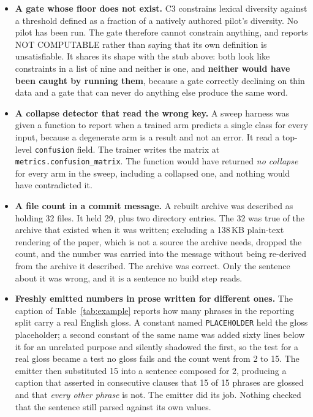 \begin{itemize}
  content, which its own summary counted as passing.
\item \textbf{A gate whose floor does not exist.} C3 constrains lexical
  diversity against a threshold defined as a fraction of a natively authored
  pilot's diversity. No pilot has been run. The gate therefore cannot constrain
  anything, and reports NOT COMPUTABLE rather than saying that its own
  definition is unsatisfiable. It shares its shape with the stub above: both
  look like constraints in a list of nine and neither is one, and \textbf{neither
  would have been caught by running them}, because a gate correctly declining on
  thin data and a gate that can never do anything else produce the same word.
\item \textbf{A collapse detector that read the wrong key.} A sweep harness was
  given a function to report when a trained arm predicts a single class for every
  input, because a degenerate arm is a result and not an error. It read a
  top-level \texttt{confusion} field. The trainer writes the matrix at
  \texttt{metrics.confusion\_matrix}. The function would have returned
  \emph{no collapse} for every arm in the sweep, including a collapsed one,
  and nothing would have contradicted it.
\item \textbf{A file count in a commit message.} A rebuilt archive was described
  as holding 32 files. It held 29, plus two directory entries. The 32 was true of
  the archive that existed when it was written; excluding a 138\,KB plain-text
  rendering of the paper, which is not a source the archive needs, dropped the
  count, and the number was carried into the message without being re-derived
  from the archive it described. The archive was correct. Only the
  sentence about it was wrong, and it is a sentence no build step reads.
\item \textbf{Freshly emitted numbers in prose written for different ones.} The
  caption of Table~\ref{tab:example} reports how many phrases in the reporting
  split carry a real English gloss. A constant named \texttt{PLACEHOLDER} held
  the gloss placeholder; a second constant of the same name was added sixty lines
  below it for an unrelated purpose and silently shadowed the first, so the test
  for a real gloss became a test no gloss fails and the count went from 2 to 15.
  The emitter then substituted 15 into a sentence composed for 2, producing a
  caption that asserted in consecutive clauses that 15 of 15 phrases are glossed
  and that \emph{every other phrase} is not. The emitter did its job. Nothing
  checked that the sentence still parsed against its own values.

\end{itemize}
